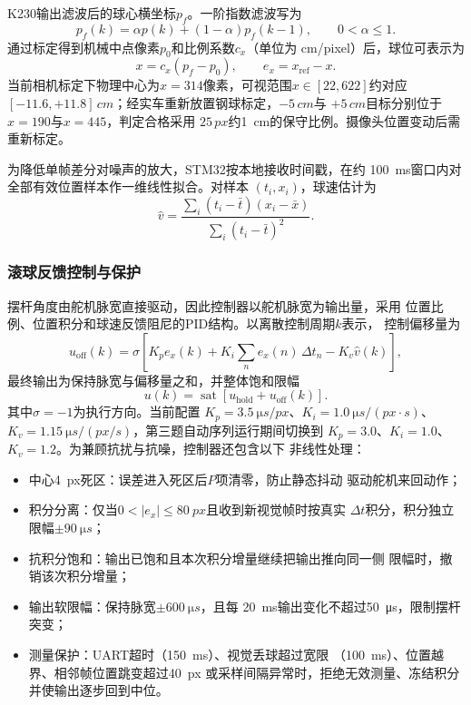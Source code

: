 K230输出滤波后的球心横坐标$p_f$。一阶指数滤波写为
\begin{equation}
  p_f(k)=\alpha p(k)+(1-\alpha)p_f(k-1),
  \qquad 0<\alpha\leq1.
  \label{eq:ema}
\end{equation}
通过标定得到机械中点像素$p_0$和比例系数$c_x$（单位为
\si{cm/pixel}）后，球位可表示为
\begin{equation}
  x=c_x(p_f-p_0),\qquad e_x=x_{\mathrm{ref}}-x.
  \label{eq:pixel-calibration}
\end{equation}
当前相机标定下物理中心为$x=314$像素，可视范围$x\in[22,622]$约对应
$[-11.6,+11.8]\,\si{cm}$；经实车重新放置钢球标定，$-5\,\si{cm}$与
$+5\,\si{cm}$目标分别位于$x=190$与$x=445$，判定合格采用
$25\,\si{px}$约\SI{1}{cm}的保守比例。摄像头位置变动后需重新标定。

为降低单帧差分对噪声的放大，STM32按本地接收时间戳，在约
\SI{100}{ms}窗口内对全部有效位置样本作一维线性拟合。对样本
$(t_i,x_i)$，球速估计为
\begin{equation}
  \hat v=
  \frac{\sum_i(t_i-\bar t)(x_i-\bar x)}
       {\sum_i(t_i-\bar t)^2}.
  \label{eq:velocity-fit}
\end{equation}

\subsubsection{滚球反馈控制与保护}

摆杆角度由舵机脉宽直接驱动，因此控制器以舵机脉宽为输出量，采用
位置比例、位置积分和球速反馈阻尼的PID结构。以离散控制周期$k$表示，
控制偏移量为
\begin{equation}
  u_{\mathrm{off}}(k)=\sigma\left[
  K_p e_x(k)+K_i\sum_{n} e_x(n)\,\Delta t_n
  -K_v\hat v(k)\right],
  \label{eq:ball-control}
\end{equation}
最终输出为保持脉宽与偏移量之和，并整体饱和限幅
\begin{equation}
  u(k)=\operatorname{sat}\!\left[u_{\mathrm{hold}}
  +u_{\mathrm{off}}(k)\right].
  \label{eq:ball-output}
\end{equation}
其中$\sigma=-1$为执行方向。当前配置
$K_p=\SI{3.5}{\micro s/px}$、$K_i=\SI{1.0}{\micro s/(px\cdot s)}$、
$K_v=\SI{1.15}{\micro s/(px/s)}$，第三题自动序列运行期间切换到
$K_p=3.0$、$K_i=1.0$、$K_v=1.2$。为兼顾抗扰与抗噪，控制器还包含以下
非线性处理：

\begin{itemize}
  \item 中心\SI{4}{px}死区：误差进入死区后$P$项清零，防止静态抖动
        驱动舵机来回动作；
  \item 积分分离：仅当$0<|e_x|\le\SI{80}{px}$且收到新视觉帧时按真实
        $\Delta t$积分，积分独立限幅$\pm\SI{90}{\micro s}$；
  \item 抗积分饱和：输出已饱和且本次积分增量继续把输出推向同一侧
        限幅时，撤销该次积分增量；
  \item 输出软限幅：保持脉宽$\pm\SI{600}{\micro s}$，且每
        \SI{20}{ms}输出变化不超过\SI{50}{\micro s}，限制摆杆突变；
  \item 测量保护：UART超时（\SI{150}{ms}）、视觉丢球超过宽限
        （\SI{100}{ms}）、位置越界、相邻帧位置跳变超过\SI{40}{px}
        或采样间隔异常时，拒绝无效测量、冻结积分并使输出逐步回到中位。
\end{itemize}


